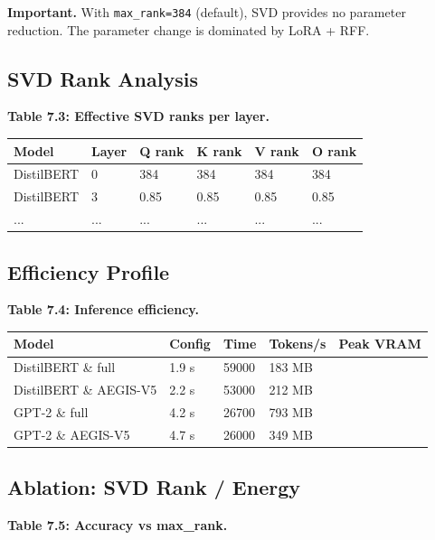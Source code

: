 \textbf{Important.} With \texttt{max\_rank=384} (default), SVD provides no parameter 
reduction. The parameter change is dominated by LoRA + RFF.

\subsection{SVD Rank Analysis}

\textbf{Table 7.3: Effective SVD ranks per layer.}

\begin{table}[H]
\centering
\small
\begin{tabular}{llllll}
\toprule
\textbf{Model} & \textbf{Layer} & \textbf{Q rank} & \textbf{K rank} & \textbf{V rank} & \textbf{O rank} \\
\midrule
DistilBERT & 0 & 384 & 384 & 384 & 384 \\
DistilBERT & 3 & 0.85 & 0.85 & 0.85 & 0.85 \\
... & ... & ... & ... & ... & ... \\
\bottomrule
\end{tabular}
\end{table}

\subsection{Efficiency Profile}

\textbf{Table 7.4: Inference efficiency.}

\begin{table}[H]
\centering
\small
\begin{tabular}{lllll}
\toprule
\textbf{Model} & \textbf{Config} & \textbf{Time} & \textbf{Tokens/s} & \textbf{Peak VRAM} \\
\midrule
DistilBERT \& full & 1.9 s & 59000 & 183 MB \\
DistilBERT \& AEGIS-V5 & 2.2 s & 53000 & 212 MB \\
GPT-2 \& full & 4.2 s & 26700 & 793 MB \\
GPT-2 \& AEGIS-V5 & 4.7 s & 26000 & 349 MB \\
\bottomrule
\end{tabular}
\end{table}

\subsection{Ablation: SVD Rank / Energy}

\textbf{Table 7.5: Accuracy vs max\_rank.}

